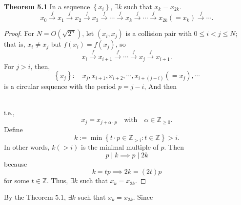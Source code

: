 \documentclass[12pt,openany]{book}
\newcommand{\mathcolorbox}[2]{\colorbox{#1}{$\displaystyle #2$}}
\newcommand{\set}[1]{\left\{#1\right\}}
\newcommand{\ie}{\textnormal{i.e.}}
\begin{document}
	\begin{tcolorbox}[colback=white]
		\textbf{Theorem 5.1}\quad
		In a sequence $\set{x_i}$, $\exists k$ such that $x_k=x_{2k}$. \[
		x_0\xrightarrow{f}x_1\xrightarrow{f}x_2\xrightarrow{f}x_3\xrightarrow{f}\cdots\xrightarrow{f}x_k\xrightarrow{f}\cdots\xrightarrow{f}x_{2k}(=x_k)\xrightarrow{f}\cdots.
		\]
		\tcblower\begin{proof}
			For $N=O(\sqrt{2^n})$, let $(x_i, x_j)$ is a collision pair with $0\leq i< j\leq N$; that is, $x_i\neq x_j$ but $f(x_i)=f(x_j)$, so \[
			x_i\xrightarrow{f}x_{i+1}\xrightarrow{f}\cdots\xrightarrow{f}x_j\xrightarrow{f}x_{i+1}.
			\] For $j>i$, then,  \[
			\set{x_j}:\quad x_j,x_{i+1},x_{i+2},\cdots, x_{i+(j-i)}(=x_j),\cdots
			\]  is a circular sequence with the period $p=j-i$, And then \begin{center}
			\end{center}\ \\ \ie, \[
			x_j=x_{j+\alpha\cdot p}\quad\text{with}\quad \alpha\in\mathbb{Z}_{\geq 0}.
			\] Define \[
			k:=\min\set{t\cdot p\in\mathbb{Z}_{>i}:t\in\mathbb{Z}}>i.
			\] In other words, $k(>i)$ is the minimal multiple of $p$. Then \[
			p\mid k \implies p\mid 2k
			\] because \[
			k=tp\implies 2k=(2t)p
			\] for some $t\in\mathbb{Z}$. Thus, $\exists k$ such that $x_k=x_{2k}$.
		\end{proof}
	\end{tcolorbox} By the Theorem 5.1, $\exists k$ such that $x_k=x_{2k}$. Since \begin{align*}

\end{align*}
\end{document}
